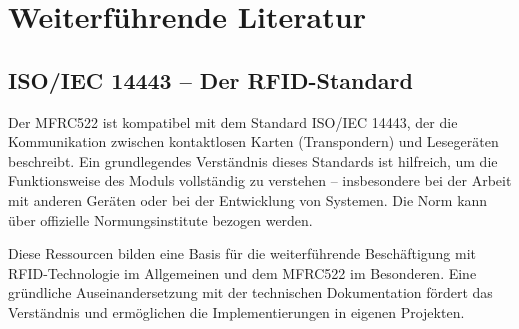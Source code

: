\section{Weiterführende Literatur}

%
%
%
%
%
%
%
%
%

\subsection{ISO/IEC 14443 – Der RFID-Standard}


Der MFRC522 ist kompatibel mit dem Standard ISO/IEC 14443, der die Kommunikation zwischen kontaktlosen Karten (Transpondern) und Lesegeräten beschreibt. Ein grundlegendes Verständnis dieses Standards ist hilfreich, um die Funktionsweise des Moduls vollständig zu verstehen – insbesondere bei der Arbeit mit anderen Geräten oder bei der Entwicklung von Systemen. Die Norm kann über offizielle Normungsinstitute bezogen werden. \cite{iso14443:2018}

Diese Ressourcen bilden eine Basis für die weiterführende Beschäftigung mit RFID-Technologie im Allgemeinen und dem MFRC522 im Besonderen. Eine gründliche Auseinandersetzung mit der technischen Dokumentation fördert das Verständnis und ermöglichen die Implementierungen in eigenen Projekten.

